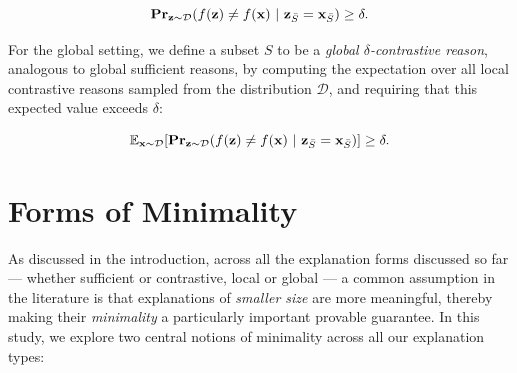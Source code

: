 \documentclass{article}
\newcommand{\z}{\textbf{z}}
\newcommand{\x}{\textbf{x}}
\begin{document}
\begin{equation}
\label{eq_con_local}
    \textbf{Pr}_{\z\sim \mathcal{D}}(f(\z) \neq f(\x) \ | \  \z_{\Bar{S}}=\x_{\Bar{S}})\geq \delta.
\end{equation}

For the global setting, we define a subset $S$ to be a \emph{global $\delta$-contrastive reason}, analogous to global sufficient reasons, by computing the expectation over all local contrastive reasons sampled from the distribution $\mathcal{D}$, and requiring that this expected value exceeds $\delta$:





\begin{equation}
\label{eq_con_global}
\mathbb{E}_{\x\sim\mathcal{D}}[\textbf{Pr}_{\z\sim \mathcal{D}}(f(\z) \neq f(\x) \ | \  \z_{\Bar{S}}= \x_{\Bar{S}})]\geq \delta.
\end{equation}


\section{Forms of Minimality}

As discussed in the introduction, across all the explanation forms discussed so far --- whether sufficient or contrastive, local or global --- a common assumption in the literature is that explanations of \emph{smaller size} are more meaningful, thereby making their \emph{minimality} a particularly important provable guarantee. In this study, we explore two central notions of minimality across all our explanation types:%
\end{document}
